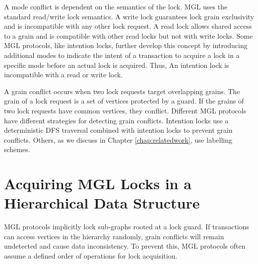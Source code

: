 A mode conflict is dependent on the semantics of the lock. MGL uses the standard read/write lock semantics. A write lock guarantees lock grain exclusivity and is incompatible with any other lock request. A read lock allows shared access to a grain and is compatible with other read locks but not with write locks. Some MGL protocols, like intention locks, further develop this concept by introducing additional modes to indicate the intent of a transaction to acquire a lock in a specific mode before an actual lock is acquired. Thus, An intention lock is incompatible with a read or write lock. 

A grain conflict occurs when two lock requests target overlapping grains. The grain of a lock request is a set of vertices protected by a guard. If the grains of two lock requests have common vertices, they conflict. Different MGL protocols have different strategies for detecting grain conflicts. Intention locks use a deterministic DFS traversal combined with intention locks to prevent grain conflicts. Others, as we discuss in Chapter \ref{chap:relatedwork}, use labelling schemes.


\section{Acquiring MGL Locks in a Hierarchical Data Structure} \label{sec:lockAcquisitionProtocol}
MGL protocols implicitly lock sub-graphs rooted at a lock guard. If transactions can access vertices in the hierarchy randomly, grain conflicts will remain undetected and cause data inconsistency. To prevent this, MGL protocols often assume a defined order of operations for lock acquisition. 

